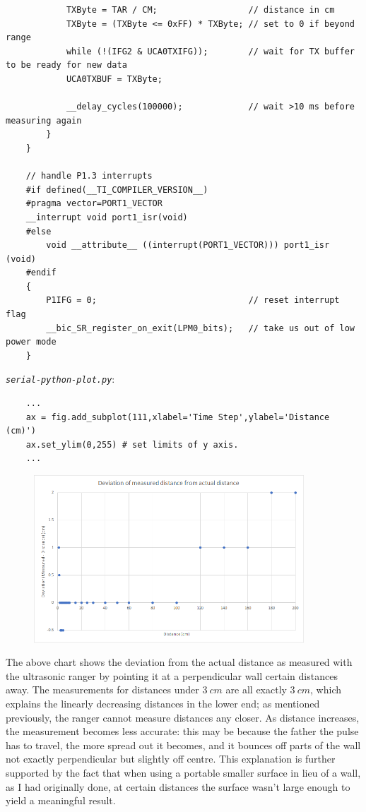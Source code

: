\documentclass[letterpaper]{article}
\begin{document}
\begin{verbatim}
            TXByte = TAR / CM;                  // distance in cm
            TXByte = (TXByte <= 0xFF) * TXByte; // set to 0 if beyond range
            while (!(IFG2 & UCA0TXIFG));        // wait for TX buffer to be ready for new data
            UCA0TXBUF = TXByte;           
    
            __delay_cycles(100000);             // wait >10 ms before measuring again
        }
    }
    
    // handle P1.3 interrupts
    #if defined(__TI_COMPILER_VERSION__)
    #pragma vector=PORT1_VECTOR
    __interrupt void port1_isr(void)
    #else
        void __attribute__ ((interrupt(PORT1_VECTOR))) port1_isr (void)
    #endif
    {
        P1IFG = 0;                              // reset interrupt flag
        __bic_SR_register_on_exit(LPM0_bits);   // take us out of low power mode
    }
	\end{verbatim}
	
	\noindent \textit{\texttt{serial-python-plot.py}}:
	\begin{verbatim}
	...
	ax = fig.add_subplot(111,xlabel='Time Step',ylabel='Distance (cm)')
	ax.set_ylim(0,255) # set limits of y axis.
	...
	\end{verbatim}
	
	\begin{figure}[H]
		\centering
		\includegraphics[width=0.9\textwidth]{ranger-measurement}
	\end{figure}

	The above chart shows the deviation from the actual distance as measured with the ultrasonic ranger by pointing it at a perpendicular wall certain distances away. The measurements for distances under $\SI{3}{cm}$ are all exactly $\SI{3}{cm}$, which explains the linearly decreasing distances in the lower end; as mentioned previously, the ranger cannot measure distances any closer. As distance increases, the measurement becomes less accurate: this may be because the father the pulse has to travel, the more spread out it becomes, and it bounces off parts of the wall not exactly perpendicular but slightly off centre. This explanation is further supported by the fact that when using a portable smaller surface in lieu of a wall, as I had originally done, at certain distances the surface wasn't large enough to yield a meaningful result.
\end{document}

